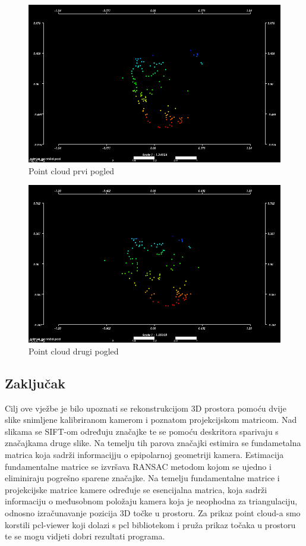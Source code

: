 \begin{figure}[h]
\centering
\includegraphics[scale=0.40]{images/lab5-pcd-01.png}
\caption{Point cloud prvi pogled}
\label{fig:lab5-pcd-01.png}
\end{figure}

\begin{figure}[h]
\centering
\includegraphics[scale=0.40]{images/lab5-pcd-02.png}
\caption{Point cloud drugi pogled}
\label{fig:lab5-pcd-02.png}
\end{figure}

\newpage
\subsection{Zaključak}
Cilj ove vježbe je bilo upoznati se rekonstrukcijom 3D prostora pomoću
dvije slike snimljene kalibriranom kamerom i poznatom projekcijskom
matricom. Nad slikama se SIFT-om određuju značajke te se pomoću deskritora
sparivaju s značajkama druge slike. Na temelju tih parova značajki
estimira se fundametalna matrica koja sadrži informacijju o epipolarnoj
geometriji kamera. Estimacija fundamentalne matrice se izvršava RANSAC
metodom kojom se ujedno i eliminiraju pogrešno sparene značajke. Na
temelju fundamentalne matrice i projekcijske matrice kamere određuje se
esencijalna matrica, koja sadrži informaciju o međusobnom položaju
kamera koja je neophodna za triangulaciju, odnosno izračunavanje
pozicija 3D točke u prostoru.
Za prikaz point cloud-a smo korstili pcl-viewer koji dolazi s pcl
bibliotekom i pruža prikaz točaka u prostoru te se mogu vidjeti
dobri rezultati programa.
